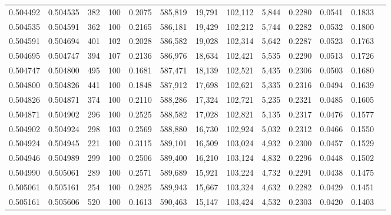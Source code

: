 \begin{tabular}{rrrrrrrrrrrrr}
0.504492 & 0.504535 &   382 & 100 &                                     0.2075 & 585,819 &  19,791 & 102,112 &   5,844 & 0.2280 & 0.0541 & 0.1833 \\
0.504535 & 0.504591 &   362 & 100 &                                     0.2165 & 586,181 &  19,429 & 102,212 &   5,744 & 0.2282 & 0.0532 & 0.1800 \\
0.504591 & 0.504694 &   401 & 102 &                                     0.2028 & 586,582 &  19,028 & 102,314 &   5,642 & 0.2287 & 0.0523 & 0.1763 \\
0.504695 & 0.504747 &   394 & 107 &                                     0.2136 & 586,976 &  18,634 & 102,421 &   5,535 & 0.2290 & 0.0513 & 0.1726 \\
0.504747 & 0.504800 &   495 & 100 &                                     0.1681 & 587,471 &  18,139 & 102,521 &   5,435 & 0.2306 & 0.0503 & 0.1680 \\
0.504800 & 0.504826 &   441 & 100 &                                     0.1848 & 587,912 &  17,698 & 102,621 &   5,335 & 0.2316 & 0.0494 & 0.1639 \\
0.504826 & 0.504871 &   374 & 100 &                                     0.2110 & 588,286 &  17,324 & 102,721 &   5,235 & 0.2321 & 0.0485 & 0.1605 \\
0.504871 & 0.504902 &   296 & 100 &                                     0.2525 & 588,582 &  17,028 & 102,821 &   5,135 & 0.2317 & 0.0476 & 0.1577 \\
0.504902 & 0.504924 &   298 & 103 &                                     0.2569 & 588,880 &  16,730 & 102,924 &   5,032 & 0.2312 & 0.0466 & 0.1550 \\
0.504924 & 0.504945 &   221 & 100 &                                     0.3115 & 589,101 &  16,509 & 103,024 &   4,932 & 0.2300 & 0.0457 & 0.1529 \\
0.504946 & 0.504989 &   299 & 100 &                                     0.2506 & 589,400 &  16,210 & 103,124 &   4,832 & 0.2296 & 0.0448 & 0.1502 \\
0.504990 & 0.505061 &   289 & 100 &                                     0.2571 & 589,689 &  15,921 & 103,224 &   4,732 & 0.2291 & 0.0438 & 0.1475 \\
0.505061 & 0.505161 &   254 & 100 &                                     0.2825 & 589,943 &  15,667 & 103,324 &   4,632 & 0.2282 & 0.0429 & 0.1451 \\
0.505161 & 0.505606 &   520 & 100 &                                     0.1613 & 590,463 &  15,147 & 103,424 &   4,532 & 0.2303 & 0.0420 & 0.1403 \\

\end{tabular}
